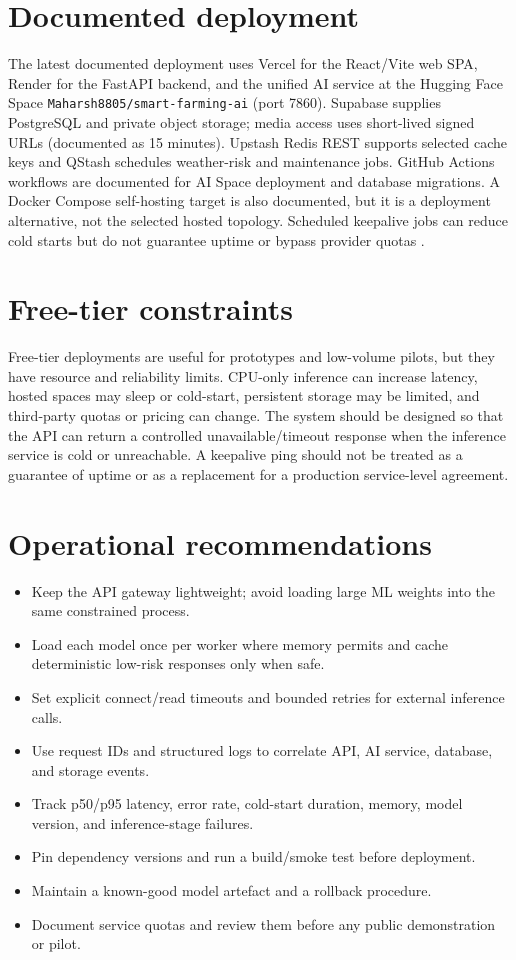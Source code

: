 \documentclass[12pt,a4paper,oneside,openany]{report}
\begin{document}
\section{Documented deployment}
The latest documented deployment uses Vercel for the React/Vite web SPA, Render for the FastAPI backend, and the unified AI service at the Hugging Face Space \texttt{Maharsh8805/smart-farming-ai} (port 7860). Supabase supplies PostgreSQL and private object storage; media access uses short-lived signed URLs (documented as 15 minutes). Upstash Redis REST supports selected cache keys and QStash schedules weather-risk and maintenance jobs. GitHub Actions workflows are documented for AI Space deployment and database migrations. A Docker Compose self-hosting target is also documented, but it is a deployment alternative, not the selected hosted topology. Scheduled keepalive jobs can reduce cold starts but do not guarantee uptime or bypass provider quotas \cite{project_readme,changelog,hf_spaces,supabase_docs}.

\section{Free-tier constraints}
Free-tier deployments are useful for prototypes and low-volume pilots, but they have resource and reliability limits. CPU-only inference can increase latency, hosted spaces may sleep or cold-start, persistent storage may be limited, and third-party quotas or pricing can change. The system should be designed so that the API can return a controlled unavailable/timeout response when the inference service is cold or unreachable. A keepalive ping should not be treated as a guarantee of uptime or as a replacement for a production service-level agreement.

\section{Operational recommendations}
\begin{itemize}
\item Keep the API gateway lightweight; avoid loading large ML weights into the same constrained process.
\item Load each model once per worker where memory permits and cache deterministic low-risk responses only when safe.
\item Set explicit connect/read timeouts and bounded retries for external inference calls.
\item Use request IDs and structured logs to correlate API, AI service, database, and storage events.
\item Track p50/p95 latency, error rate, cold-start duration, memory, model version, and inference-stage failures.
\item Pin dependency versions and run a build/smoke test before deployment.
\item Maintain a known-good model artefact and a rollback procedure.
\item Document service quotas and review them before any public demonstration or pilot.
\end{itemize}
\end{document}

